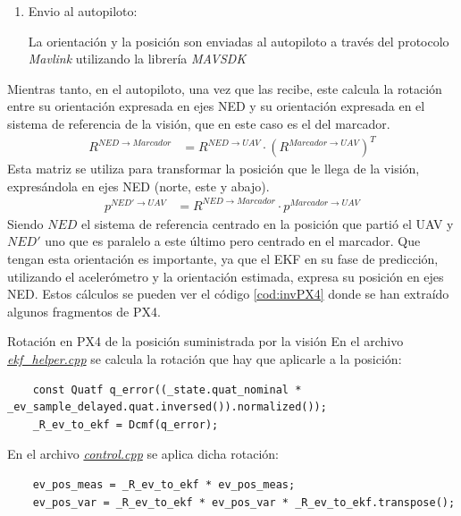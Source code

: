 \begin{enumerate}
	
\item Envio al autopiloto: 

	La orientación y la posición son enviadas al autopiloto a través del protocolo \textit{Mavlink} utilizando la librería \textit{MAVSDK}

\end{enumerate}

Mientras tanto, en el autopiloto, una vez que las recibe, este calcula la rotación entre su orientación expresada en ejes NED y su orientación expresada en el sistema de referencia de la visión, que en este caso es el del marcador. 
\begin{align}
R^{NED \rightarrow Marcador}& =  R^{NED \rightarrow UAV} \cdot  \left(R^{Marcador \rightarrow UAV}\right)^T
\end{align}
Esta matriz se utiliza para transformar la posición que le llega de la visión, expresándola en ejes NED (norte, este y abajo).
\begin{align}
p^{NED' \rightarrow UAV}& = R^{NED \rightarrow Marcador} \cdot p^{Marcador \rightarrow UAV}
\end{align}
Siendo $NED$ el sistema de referencia centrado en la posición que partió el UAV y $NED'$ uno que es paralelo a este último pero centrado en el marcador.
Que tengan esta orientación es importante, ya que el EKF en su fase de predicción, utilizando el acelerómetro y la orientación estimada, expresa su posición en ejes NED.
Estos cálculos se pueden ver el código \ref{cod:invPX4} donde se han extraído algunos fragmentos de PX4. 

\begin{codigo}[label=cod:invPX4]{Rotación en PX4 de la posición suministrada por la visión}
En el archivo \href{https://github.com/PX4/PX4-ECL/blob/ec934908900b23ee273d1a9f82364b7b38423200/EKF/ekf\_helper.cpp\#L1460}{\textit{ekf\_helper.cpp}} se calcula la rotación que hay que aplicarle a la posición:
\begin{verbatim}
    const Quatf q_error((_state.quat_nominal * _ev_sample_delayed.quat.inversed()).normalized());
    _R_ev_to_ekf = Dcmf(q_error);
\end{verbatim}
En el archivo \href{https://github.com/PX4/PX4-ECL/blob/ec934908900b23ee273d1a9f82364b7b38423200/EKF/control.cpp\#L273}{\textit{control.cpp}} se aplica dicha rotación:
\begin{verbatim}
    ev_pos_meas = _R_ev_to_ekf * ev_pos_meas;
    ev_pos_var = _R_ev_to_ekf * ev_pos_var * _R_ev_to_ekf.transpose();
\end{verbatim}
\end{codigo} 

